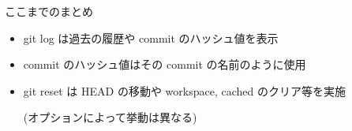 
\begin{frame}[t]{ここまでのまとめ}{}

  \begin{itemize}
  \item git log は過去の履歴や commit のハッシュ値を表示
    \vspace{2ex}

  \item commit のハッシュ値はその commit の名前のように使用
    \vspace{2ex}

  \item git reset は HEAD の移動や workspace, cached のクリア等を実施

    (オプションによって挙動は異なる)
  \end{itemize}

\end{frame}
